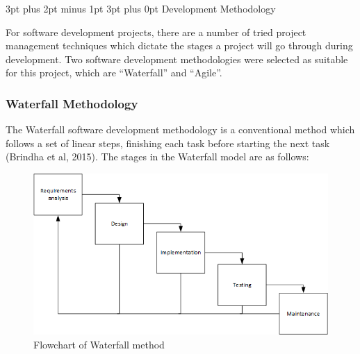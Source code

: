 \documentclass[12pt,a4paper]{article}
\makeatletter
\renewcommand\subsection{\@startsection {subsection}{1}{2mm} %
                               {3pt plus 2pt minus 1pt} %
                               {3pt plus 0pt} %
                               {\normalfont\bfseries}}
\makeatother
\begin{document}
\FloatBarrier

\subsection{Development Methodology}

For software development projects, there are a number of tried project management techniques which dictate the stages a project will go through during development. Two software development methodologies were selected as suitable for this project, which are ``Waterfall'' and ``Agile''.

\subsubsection{Waterfall Methodology}

The Waterfall software development methodology is a conventional method which follows a set of linear steps, finishing each task before starting the next task (Brindha et al, 2015). The stages in the Waterfall model are as follows:

\begin{figure}[H]
    \centering
    \includegraphics[scale=0.75]{Report/graphics/waterfall.png}
    \caption{Flowchart of Waterfall method}
    \label{fig:waterfall}
\end{figure}
\end{document}
